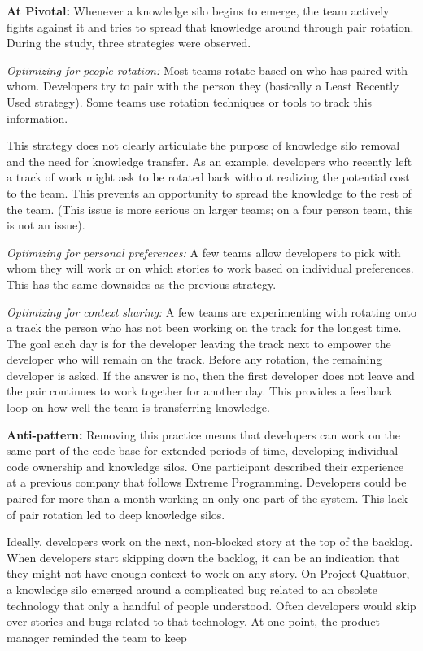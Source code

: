 \textbf{At Pivotal:} Whenever a knowledge silo begins to emerge, the team actively fights against it and tries to spread that knowledge around through pair rotation. During the study, three strategies were observed.

\textit{Optimizing for people rotation:} Most teams rotate based on who has paired with whom. Developers try to pair with the person they  (basically a Least Recently Used strategy). Some teams use rotation techniques or tools to track this information.

This strategy does not clearly articulate the purpose of knowledge silo removal and the need for knowledge transfer. As an example, developers who recently left a track of work might ask to be rotated back without realizing the potential cost to the team. This prevents an opportunity to spread the knowledge to the rest of the team. (This issue is more serious on larger teams; on a four person team, this is not an issue).

\textit{Optimizing for personal preferences:} A few teams allow developers to pick with whom they will work or on which stories to work based on individual preferences. This has the same downsides as the previous strategy. 

\textit{Optimizing for context sharing:} A few teams are experimenting with rotating onto a track the person who has not been working on the track for the longest time. The goal each day is for the developer leaving the track next to empower the developer who will remain on the track. Before any rotation, the remaining developer is asked,  If the answer is no, then the first developer does not leave and the pair continues to work together for another day. This provides a feedback loop on how well the team is transferring knowledge. 

\textbf{Anti-pattern:} Removing this practice means that developers can work on the same part of the code base for extended periods of time, developing individual code ownership and knowledge silos. One participant described their experience at a previous company that follows Extreme Programming. Developers could be paired for more than a month working on only one part of the system. This lack of pair rotation led to deep knowledge silos. 

Ideally, developers work on the next, non-blocked story at the top of the backlog. When developers start skipping down the backlog, it can be an indication that they might not have enough context to work on any story. On Project Quattuor, a knowledge silo emerged around a complicated bug related to an obsolete technology that only a handful of people understood. Often developers would skip over stories and bugs related to that technology. At one point, the product manager reminded the team to keep 

